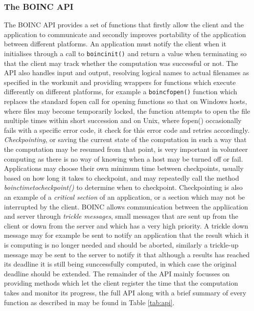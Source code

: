 \subsubsection{The BOINC API}
The BOINC API provides a set of functions that firstly allow the client and the application to communicate and secondly improves portability of the application between different platforms.
An application must notify the client when it initialises through a call to \texttt{boincinit()} and return a value when terminating so that the client may track whether the computation was successful or not. 
The API also handles input and output, resolving logical names to actual filenames as specified in the workunit and providing wrappers for functions which execute differently on different platforms, for example a \texttt{boincfopen()} function which replaces the standard fopen call for opening functions so that on Windows hosts, where files may become temporarily locked, the function attempts to open the file multiple times within short succession and on Unix, where fopen() occasionally fails with a specific error code, it check for this error code and retries accordingly. 
\emph{Checkpointing}, or saving the current state of the computation in such a way that the computation may be resumed from that point, is very important in volunteer computing as there is no way of knowing when a host may be turned off or fail. Applications may choose their own minimum time between checkpoints, usually based on how long it takes to checkpoint, and may repeatedly call the method \emph{boinctimetocheckpoint()} to determine when to checkpoint. Checkpointing is also an example of a \emph{critical section} of an application, or a section which may not be interrupted by the client. 
BOINC  allows communication between the appliication and server through \emph{trickle messages}, small messages that are sent up from the client or down from the server and which has a very high priority. A trickle down message may for example be sent to notify an application that the result which it is computing is no longer needed and should be aborted, similarly a trickle-up message may be sent to the server to notify it that although a results has reached its deadline it is still being sunccessfully computed, in which case the original deadline should be extended.
The remainder of the API mainly focusses on providing methods which let the client register the time that the computation takes and monitor its progress, the full API along with a brief summary of every function as described in \cite{boincwiki, boincgit} may be found in Table \ref{tab:api}.
